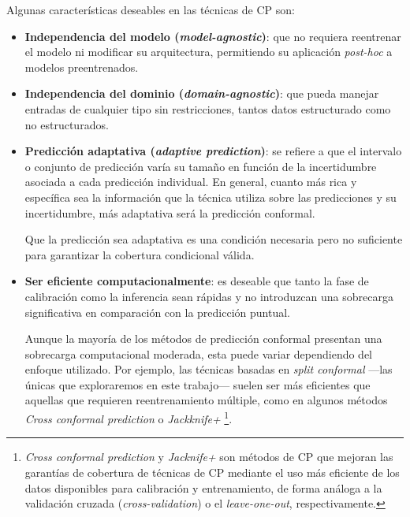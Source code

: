Algunas características deseables en las técnicas de \acrshort{CP} son:

\begin{itemize}
    \item \textbf{Independencia del modelo (\textit{model-agnostic})}: que no requiera reentrenar el modelo ni modificar su arquitectura, permitiendo su aplicación \textit{post-hoc} a modelos preentrenados.

    \item \textbf{Independencia del dominio (\textit{domain-agnostic})}: que pueda manejar entradas de cualquier tipo sin restricciones, tantos datos estructurado como no estructurados.
     
    \item \textbf{Predicción adaptativa (\textit{adaptive prediction})}: se refiere a que el intervalo o conjunto de predicción varía su tamaño en función de la incertidumbre asociada a cada predicción individual. En general, cuanto más rica y específica sea la información que la técnica utiliza sobre las predicciones y su incertidumbre, más adaptativa será la predicción conformal. 
    
    Que la predicción sea adaptativa es una condición necesaria pero no suficiente para garantizar la cobertura condicional válida. 

    \item \textbf{Ser eficiente computacionalmente}: es deseable que tanto la fase de calibración como la inferencia sean rápidas y no introduzcan una sobrecarga significativa en comparación con la predicción puntual.
    
    Aunque la mayoría de los métodos de predicción conformal presentan una sobrecarga computacional moderada, esta puede variar dependiendo del enfoque utilizado. Por ejemplo, las técnicas basadas en \textit{split conformal} ---las únicas que exploraremos en este trabajo--- suelen ser más eficientes que aquellas que requieren reentrenamiento múltiple, como en algunos métodos \textit{Cross conformal prediction} o \textit{Jackknife+}%
    \footnote{
        \textit{Cross conformal prediction} \cite{vovk2015} y \textit{Jacknife+} \cite{barber2021} son métodos de \acrshort{CP} que mejoran las garantías de cobertura de técnicas de \acrshort{CP} mediante el uso más eficiente de los datos disponibles para calibración y entrenamiento, de forma análoga a la validación cruzada (\textit{cross-validation}) o el \textit{leave-one-out}, respectivamente.
    }.
    

\end{itemize}

